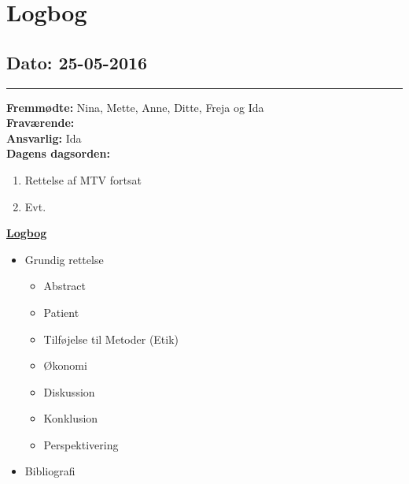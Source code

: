 \chapter{Logbog}
\section{Dato: 25-05-2016}
\hrule
\textbf{Fremmødte:} Nina, Mette, Anne, Ditte, Freja og Ida  \\
\textbf{Fraværende: } \\
\textbf{Ansvarlig:} Ida  \\
\textbf{Dagens dagsorden: }
\begin{enumerate}
\item Rettelse af MTV fortsat
\item Evt.
\end{enumerate}

\underline{\textbf{Logbog}}
\begin{itemize}
\item Grundig rettelse
\begin{itemize}
\item Abstract
\item Patient
\item Tilføjelse til Metoder (Etik)
\item Økonomi
\item Diskussion
\item Konklusion
\item Perspektivering
\end{itemize}
\item Bibliografi
\end{itemize}
\newpage
